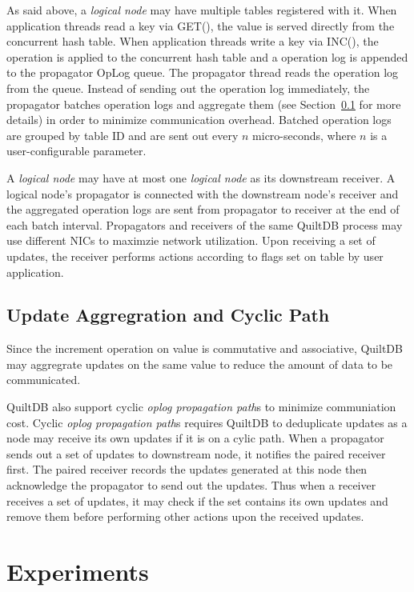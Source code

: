 \documentclass{acm_proc_article-sp}
\begin{document}
As said above, a \emph{logical node} may have multiple tables registered with it. 
When application threads read a key via GET(), the value is served directly from
the concurrent hash table. When application threads write a key via INC(), the 
operation is applied to the concurrent hash table and a operation log is 
appended to the propagator OpLog queue. The propagator thread reads the 
operation log from the queue. Instead of sending out the operation log 
immediately, the propagator batches operation logs and aggregate them (see
Section~\ref{sec:update-aggreg} for more details) in order to minimize 
communication overhead. Batched operation logs are grouped by table ID and are
sent out every $n$ micro-seconds, where $n$ is a user-configurable parameter.

A \emph{logical node} may have at most one \emph{logical node} as its downstream
receiver. A logical node's propagator is connected with the downstream node's 
receiver and the aggregated operation logs are sent from propagator to receiver
at the end of each batch interval. Propagators and receivers of the same QuiltDB
process may use different NICs to maximzie network utilization. Upon receiving 
a set of updates, the receiver performs actions according to flags set on table
by user application.

\subsection{Update Aggregration and Cyclic Path}
\label{sec:update-aggreg}
\label{sec:cyclic-path}

Since the increment operation on value is commutative and associative, QuiltDB 
may aggregrate updates on the same value to reduce the amount of data to be 
communicated.

QuiltDB also support cyclic \emph{oplog propagation path}s to minimize 
communiation cost. Cyclic \emph{oplog propagation path}s requires QuiltDB to 
deduplicate updates as a node may receive its own updates if it is on a cylic
path. When a propagator sends out a set of updates to downstream node, it 
notifies the paired receiver first. The paired receiver records the updates 
generated at this node then acknowledge the propagator to send out the updates.
Thus when a receiver receives a set of updates, it may check if the set contains
its own updates and remove them before performing other actions upon the 
received updates.




\section{Experiments}
\end{document}
